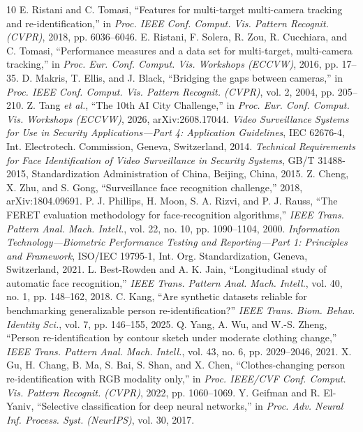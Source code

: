 \documentclass[journal]{IEEEtran}
\begin{document}
\begin{thebibliography}{10}
 E. Ristani and C. Tomasi, ``Features for multi-target multi-camera tracking and re-identification,'' in \emph{Proc. IEEE Conf. Comput. Vis. Pattern Recognit. (CVPR)}, 2018, pp. 6036--6046.
 E. Ristani, F. Solera, R. Zou, R. Cucchiara, and C. Tomasi, ``Performance measures and a data set for multi-target, multi-camera tracking,'' in \emph{Proc. Eur. Conf. Comput. Vis. Workshops (ECCVW)}, 2016, pp. 17--35.
 D. Makris, T. Ellis, and J. Black, ``Bridging the gaps between cameras,'' in \emph{Proc. IEEE Conf. Comput. Vis. Pattern Recognit. (CVPR)}, vol. 2, 2004, pp. 205--210.
 Z. Tang \emph{et al.}, ``The 10th AI City Challenge,'' in \emph{Proc. Eur. Conf. Comput. Vis. Workshops (ECCVW)}, 2026, arXiv:2608.17044.
 \emph{Video Surveillance Systems for Use in Security Applications---Part 4: Application Guidelines}, IEC 62676-4, Int. Electrotech. Commission, Geneva, Switzerland, 2014.
 \emph{Technical Requirements for Face Identification of Video Surveillance in Security Systems}, GB/T 31488-2015, Standardization Administration of China, Beijing, China, 2015.
 Z. Cheng, X. Zhu, and S. Gong, ``Surveillance face recognition challenge,'' 2018, arXiv:1804.09691.
 P. J. Phillips, H. Moon, S. A. Rizvi, and P. J. Rauss, ``The FERET evaluation methodology for face-recognition algorithms,'' \emph{IEEE Trans. Pattern Anal. Mach. Intell.}, vol. 22, no. 10, pp. 1090--1104, 2000.
 \emph{Information Technology---Biometric Performance Testing and Reporting---Part 1: Principles and Framework}, ISO/IEC 19795-1, Int. Org. Standardization, Geneva, Switzerland, 2021.
 L. Best-Rowden and A. K. Jain, ``Longitudinal study of automatic face recognition,'' \emph{IEEE Trans. Pattern Anal. Mach. Intell.}, vol. 40, no. 1, pp. 148--162, 2018.
 C. Kang, ``Are synthetic datasets reliable for benchmarking generalizable person re-identification?'' \emph{IEEE Trans. Biom. Behav. Identity Sci.}, vol. 7, pp. 146--155, 2025.
 Q. Yang, A. Wu, and W.-S. Zheng, ``Person re-identification by contour sketch under moderate clothing change,'' \emph{IEEE Trans. Pattern Anal. Mach. Intell.}, vol. 43, no. 6, pp. 2029--2046, 2021.
 X. Gu, H. Chang, B. Ma, S. Bai, S. Shan, and X. Chen, ``Clothes-changing person re-identification with RGB modality only,'' in \emph{Proc. IEEE/CVF Conf. Comput. Vis. Pattern Recognit. (CVPR)}, 2022, pp. 1060--1069.
 Y. Geifman and R. El-Yaniv, ``Selective classification for deep neural networks,'' in \emph{Proc. Adv. Neural Inf. Process. Syst. (NeurIPS)}, vol. 30, 2017.

\end{thebibliography}
\end{document}
